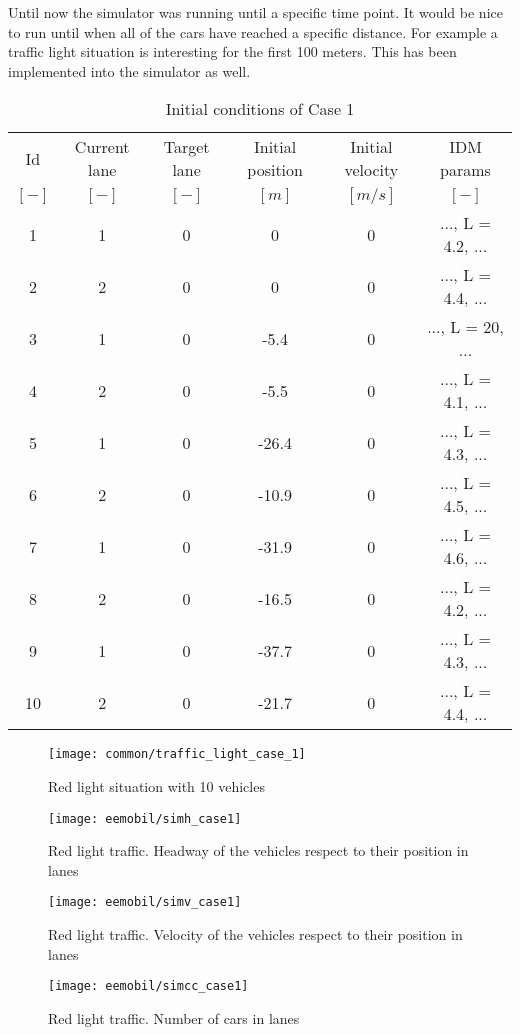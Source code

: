 		Until now the simulator was running until a specific time point. It would be nice to run until when all of the cars have reached a specific distance. For example a traffic light situation is interesting for the first 100 meters. This has been implemented into the simulator as well.
		\begin{table}
			\begin{center}
				\begin{tabular}{ |c|c|c|c|c|c| }
					\hline
					Id & Current lane & Target lane & Initial position & Initial velocity& IDM params\\
					$[-]$ & $[-]$ & $[-]$ & $[m]$ & $[m/s]$ & $[-]$\\
					\hline
					1 & 1 & 0 & 0 & 0 & ..., L = 4.2, ... \\
					2 & 2 & 0 & 0 & 0 & ..., L = 4.4, ... \\
					3 & 1 & 0 & -5.4 & 0 & ..., L = 20, ... \\
					4 & 2 & 0 & -5.5 & 0 & ..., L = 4.1, ... \\
					5 & 1 & 0 & -26.4 & 0 & ..., L = 4.3, ... \\
					6 & 2 & 0 & -10.9 & 0 & ..., L = 4.5, ... \\
					7 & 1 & 0 & -31.9 & 0 & ..., L = 4.6, ... \\
					8 & 2 & 0 & -16.5 & 0 & ..., L = 4.2, ... \\
					9 & 1 & 0 & -37.7 & 0 & ..., L = 4.3, ... \\
					10 & 2 & 0 & -21.7 & 0 & ..., L = 4.4, ... \\
					\hline
				\end{tabular}
			\end{center}
			\caption{Initial conditions of Case 1}
			\label{tab:case_1_definition_array}
		\end{table}
		\begin{figure}
			\centering
			\texttt{[image: common/traffic\_light\_case\_1]}
			\caption{Red light situation with 10 vehicles}
			\label{fig:red_light_situation}
		\end{figure}
		\begin{figure}
			\centering
			\texttt{[image: eemobil/simh\_case1]}
			\caption{Red light traffic. Headway of the vehicles respect to their position in lanes}
			\label{fig:red_light_situationh}
		\end{figure}
		\begin{figure}
			\centering
			\texttt{[image: eemobil/simv\_case1]}
			\caption{Red light traffic. Velocity of the vehicles respect to their position in lanes}
			\label{fig:red_light_situationv}
		\end{figure}
		\begin{figure}
			\centering
			\texttt{[image: eemobil/simcc\_case1]}
			\caption{Red light traffic. Number of cars in lanes }
			\label{fig:red_light_situationcc}
		\end{figure}
